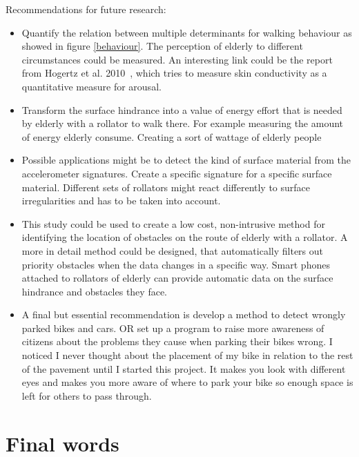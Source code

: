 Recommendations for future research:

\begin{itemize}
\item Quantify the relation between multiple determinants for walking behaviour as showed in figure \ref{behaviour}. The perception of elderly to different circumstances could be measured. An interesting link could be the report from Hogertz et al. 2010~\cite{Sauter2010}, which tries to measure skin conductivity as a quantitative measure for arousal. 

\item Transform the surface hindrance into a value of energy effort that is needed by elderly with a rollator to walk there. For example measuring the amount of energy elderly consume. Creating a sort of wattage of elderly people

\item Possible applications might be to detect the kind of surface material from the accelerometer signatures. Create a specific signature for a specific surface material. Different sets of rollators might react differently to surface irregularities and has to be taken into account.

\item This study could be used to create a low cost, non-intrusive method for identifying the location of obstacles on the route of elderly with a rollator. A more in detail method could be designed, that automatically filters out priority obstacles when the data changes in a specific way. Smart phones attached to rollators of elderly can provide automatic data on the surface hindrance and obstacles they face. 

\item A final but essential recommendation is develop a method to detect wrongly parked bikes and cars. OR set up a program to raise more awareness of citizens about the problems they cause when parking their bikes wrong. I noticed I never thought about the placement of my bike in relation to the rest of the pavement until I started this project. It makes you look with different eyes and makes you more aware of where to park your bike so enough space is left for others to pass through. 

\end{itemize}

\section{Final words}

